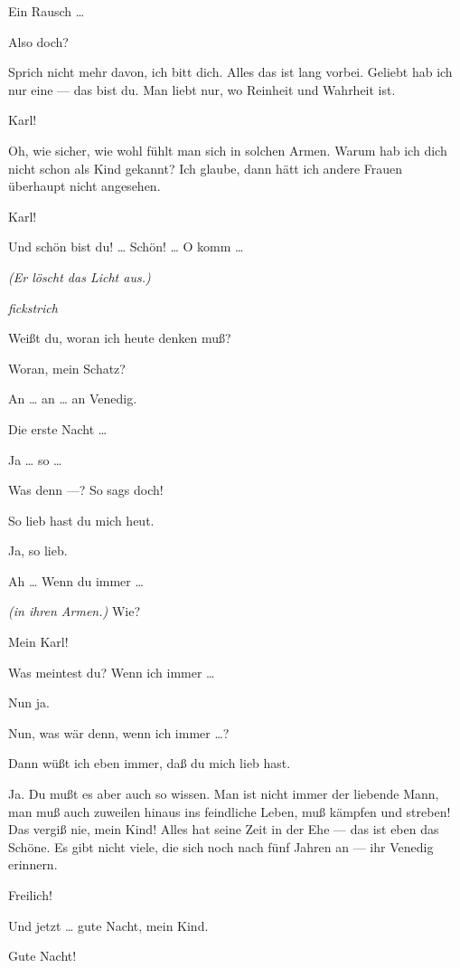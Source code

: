 \documentclass[
	final,
	a4paper,
	ngerman,
	mpinclude = true, %
	twoside = true,
	open = right,
	cleardoublepage = plain,
	DIV = 13,
	BCOR = 1cm,
	titlepage = firstiscover,
	]{scrbook}
\newcommand{\direction}[1]{\textit{(#1)}}
\newcommand{\hiat}{%
	\begin{center}
		\tiny
		\raisebox{0.5ex}{\rule{0.3\linewidth}{0.4pt}}
		\textit{fickstrich}
		\raisebox{0.5ex}{\rule{0.3\linewidth}{0.4pt}}
	\end{center}
}
\newcommand{\thecharacter}[1]{\textup{\textsc{#1}}\xspace}
\newcommand{\thefrau}{\thecharacter{Emma}}
\newcommand{\thegatte}{\thecharacter{Christian}}
\newcommand{\character}[1]{\item[#1:]}
\newcommand{\frau}{\character{\thefrau}}
\newcommand{\gatte}{\character{\thegatte}}
\begin{document}
\begin{play}
	\gatte
	Ein Rausch \ldots{}

	\frau
	Also doch?

	\gatte
	Sprich nicht mehr davon, ich bitt dich. Alles das ist lang vorbei. Geliebt hab ich nur eine --- das bist du. Man liebt nur, wo Reinheit und Wahrheit ist.

	\frau
	Karl!

	\gatte
	Oh, wie sicher, wie wohl fühlt man sich in solchen Armen. Warum hab ich dich nicht schon als Kind gekannt? Ich glaube, dann hätt ich andere Frauen überhaupt nicht angesehen.

	\frau
	Karl!

	\gatte
	Und schön bist du! \ldots{} Schön! \ldots{} O komm \ldots{}

	\direction{Er löscht das Licht aus.}

	\hiat

	\frau
	Weißt du, woran ich heute denken muß?

	\gatte
	Woran, mein Schatz?

	\frau
	An \ldots{} an \ldots{} an Venedig.

	\gatte
	Die erste Nacht \ldots{}

	\frau
	Ja \ldots{} so \ldots{}

	\gatte
	Was denn ---? So sags doch!

	\frau
	So lieb hast du mich heut.

	\gatte
	Ja, so lieb.

	\frau
	Ah \ldots{} Wenn du immer \ldots{}

	\gatte
	\direction{in ihren Armen.} Wie?

	\frau
	Mein Karl!

	\gatte
	Was meintest du? Wenn ich immer \ldots{}

	\frau
	Nun ja.

	\gatte
	Nun, was wär denn, wenn ich immer \ldots{}?

	\frau
	Dann wüßt ich eben immer, daß du mich lieb hast.

	\gatte
	Ja. Du mußt es aber auch so wissen. Man ist nicht immer der liebende Mann, man muß auch zuweilen hinaus ins feindliche Leben, muß kämpfen und streben! Das vergiß nie, mein Kind! Alles hat seine Zeit in der Ehe --- das ist eben das Schöne. Es gibt nicht viele, die sich noch nach fünf Jahren an --- ihr Venedig erinnern.

	\frau
	Freilich!

	\gatte
	Und jetzt \ldots{} gute Nacht, mein Kind.

	\frau
	Gute Nacht!

\end{play}
\end{document}
